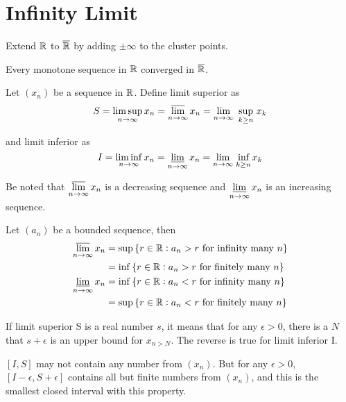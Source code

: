 \section{Infinity Limit}

Extend $\mathbb{R}$ to $\overline{\mathbb{R}}$ by adding $\pm \infty$ to the cluster points.

\begin{theorem}
    Every monotone sequence in $\mathbb{R}$ converged in $\overline{\mathbb{R}}$.
\end{theorem}


\begin{definition}
    Let $(x_n)$ be a sequence in $\mathbb{R}$. Define limit superior as
    \begin{equation}
        S = \limsup_{n \rightarrow \infty} x_n = \varlimsup_{n\rightarrow \infty} x_n = \lim_{n \rightarrow \infty} \underset{k \geq n}{\text{ sup }} x_k
    \end{equation}
    
    and limit inferior as
    \begin{equation}
        I = \liminf_{n \rightarrow \infty} x_n = \varliminf_{n\rightarrow \infty} x_n = \lim_{n \rightarrow \infty} \underset{k \geq n}{\text{ inf }} x_k
    \end{equation}    
\end{definition}

Be noted that $\displaystyle \varlimsup_{n\rightarrow \infty} x_n$ is a decreasing sequence and $\displaystyle \varliminf_{n\rightarrow \infty} x_n$ is an increasing sequence.


\begin{theorem}\label{definition_of_limit_superium_infinium}
    Let $(a_n)$ be a bounded sequence, then
    \begin{equation}
        \begin{aligned}
            \varlimsup_{n\rightarrow \infty} x_n &= \sup \set{r \in \mathbb{R}: a_n > r \text{ for infinity many } n} \\
            &= \inf \set{r \in \mathbb{R}: a_n > r \text{ for finitely many } n} \\
            \varliminf_{n\rightarrow \infty} x_n &= \inf \set{r \in \mathbb{R}: a_n < r \text{ for infinity many } n} \\
            &= \sup \set{r \in \mathbb{R}: a_n < r \text{ for finitely many } n} 
        \end{aligned}
    \end{equation}

    
    If limit superior S is a real number $s$, it means that for any $\epsilon>0$, there is a $N$ that $s + \epsilon$ is an upper bound for $x_{n > N}$. The reverse is true for limit inferior I.

    $[I,S]$ may not contain any number from $(x_n)$. But for any $\epsilon >0$, $[I - \epsilon, S + \epsilon]$ contains all but finite numbers from $(x_n)$, and this is the smallest closed interval with this property.
\end{theorem}




